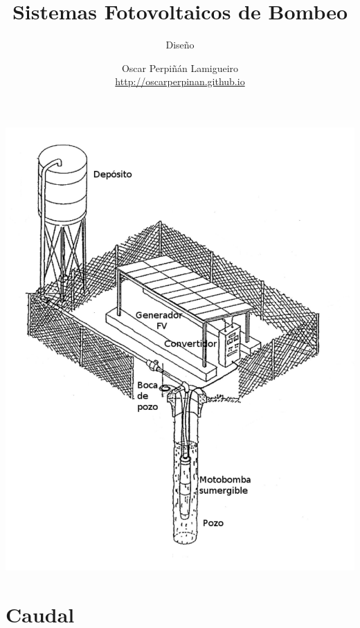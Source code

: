 \documentclass[xcolor={usenames,svgnames,dvipsnames}]{beamer}
\author{Oscar Perpiñán Lamigueiro \\ \url{http://oscarperpinan.github.io}}
\date{}
\title{Sistemas Fotovoltaicos de Bombeo}
\subtitle{Diseño}
\begin{document}
\maketitle

\begin{frame}[label={sec:orgf18df40}]{}
\begin{center}
\begin{center}
\includegraphics[height=0.9\textheight]{../figs/EsquemaBombeo_oscar.pdf}
\end{center}
\end{center}
\end{frame}


\section{Caudal}
\label{sec:org9995f73}
\end{document}
